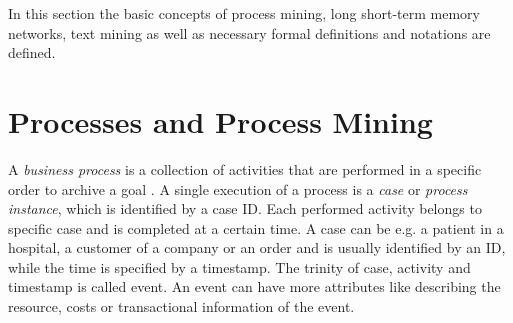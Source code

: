 In this section the basic concepts of process mining, long short-term memory networks, text mining as well as necessary formal definitions and notations are defined.




\section{Processes and Process Mining}

A \textit{business process} is a collection of activities that are performed in a specific order to archive a goal \cite{DBLP:conf/bpm/AalstAM11}.
A single execution of a process is a \textit{case} or \textit{process instance}, which is identified by a case ID.
Each performed activity belongs to specific case and is completed at a certain time.
A case can be e.g. a patient in a hospital, a customer of a company or an order and is usually identified by an ID, while 
the time is specified by a timestamp.
The trinity of case, activity and timestamp is called event.
An event can have more attributes like describing the resource, costs or transactional information of the event.

